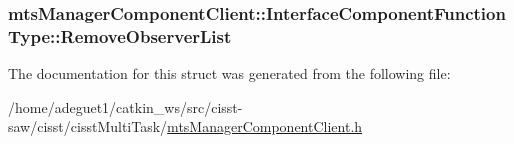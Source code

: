 \hypertarget{structmts_manager_component_client_1_1_interface_component_function_type_a199fcb11e739ade7ff2b787b899ac5c3}{
\subsubsection[{Remove\-Observer\-List}]{ mts\-Manager\-Component\-Client\-::\-Interface\-Component\-Function\-Type\-::\-Remove\-Observer\-List}}\label{structmts_manager_component_client_1_1_interface_component_function_type_a199fcb11e739ade7ff2b787b899ac5c3}


The documentation for this struct was generated from the following file\-:\begin{DoxyCompactItemize}
\item 
/home/adeguet1/catkin\-\_\-ws/src/cisst-\/saw/cisst/cisst\-Multi\-Task/\hyperlink{mts_manager_component_client_8h}{mts\-Manager\-Component\-Client.\-h}\end{DoxyCompactItemize}
